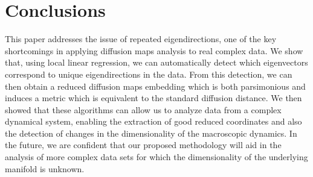 \section{Conclusions}

This paper addresses the issue of repeated eigendirections, one of the key shortcomings in applying diffusion maps analysis to real complex data.
%
We show that, using local linear regression, we can automatically detect which eigenvectors correspond to unique eigendirections in the data.
%
From this detection, we can then obtain a reduced diffusion maps embedding which is both parsimonious and induces a metric which is equivalent to the standard diffusion distance.
%
We then showed that these algorithms can allow us to analyze data from a complex dynamical system, enabling the extraction of good reduced coordinates and also the detection of changes in the dimensionality of the macroscopic dynamics.
%
In the future, we are confident that our proposed methodology will aid in the analysis of more complex data sets for which the dimensionality of the underlying manifold is unknown.